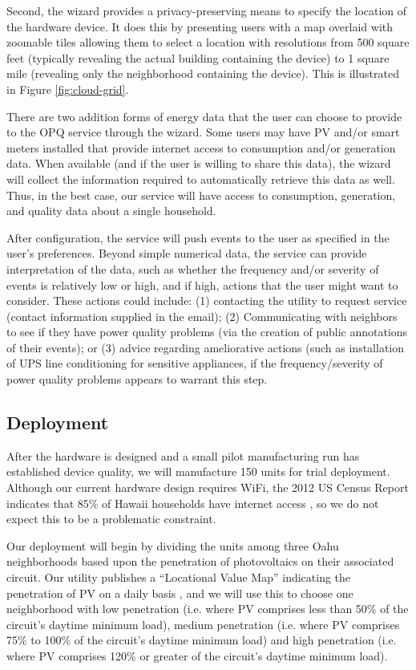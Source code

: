 Second, the wizard provides a privacy-preserving means to specify the location of the hardware device. It does this by presenting users with a map overlaid with zoomable tiles allowing them to select a location with resolutions from 500 square feet (typically revealing the actual building containing the device) to 1 square mile (revealing only the neighborhood containing the device). This is illustrated in Figure \ref{fig:cloud-grid}.

There are two addition forms of energy data that the user can choose to provide to the OPQ service through the wizard.  Some users may have PV and/or smart meters installed that provide internet access to consumption and/or generation data.  When available (and if the user is willing to share this data), the wizard will collect the information required to automatically retrieve this data as well.  Thus, in the best case, our service will have access to consumption, generation, and quality data about a single household.

After configuration, the service will push events to the user as specified in the user's preferences.  Beyond simple numerical data, the service can provide interpretation of the data, such as whether the frequency and/or severity of events is relatively low or high, and if high, actions that the user might want to consider.  These actions could include: (1) contacting the utility to request service (contact information supplied in the email); (2) Communicating with neighbors to see if they have power quality problems (via the creation of public annotations of their events); or (3) advice regarding ameliorative actions (such as installation of UPS line conditioning for sensitive appliances, if the frequency/severity of power quality problems appears to warrant this step.

\subsection{Deployment}

After the hardware is designed and a small pilot manufacturing run has established device quality, we will manufacture 150 units for trial deployment.  Although our current hardware design requires WiFi, the 2012 US Census Report indicates that 85\% of Hawaii households have internet access \cite{home-internet-access}, so we do not expect this to be a problematic constraint. 

Our deployment will begin by dividing the units among three Oahu neighborhoods based upon the penetration of photovoltaics on their associated circuit.  Our utility publishes a ``Locational Value Map'' indicating the penetration of PV on a daily basis \cite{lvm}, and we will use this to choose one neighborhood with low penetration (i.e. where PV comprises less than 50\% of the circuit's daytime minimum load), medium penetration (i.e. where PV comprises 75\% to 100\% of the circuit's daytime minimum load) and high penetration (i.e. where PV comprises 120\% or greater of the circuit's daytime minimum load). 


